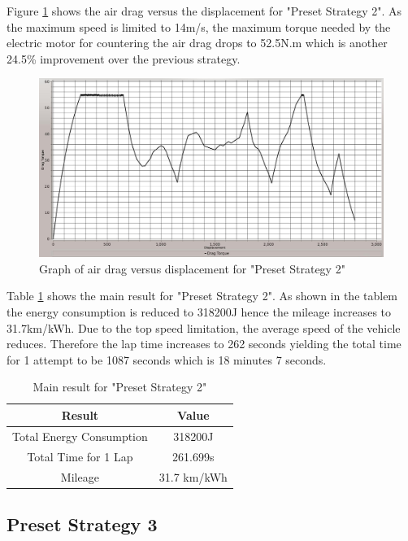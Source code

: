 Figure \ref{im:2_3} shows the air drag versus the displacement for "Preset Strategy 2". As the maximum speed is limited to 14m/s, the maximum torque needed by the electric motor for countering the air drag drops to 52.5N.m which is another 24.5\% improvement over the previous strategy.

\begin{figure}[htb]
	\centering
	\includegraphics[width=6in]{images/2_3.jpg}
	\caption{Graph of air drag versus displacement for "Preset Strategy 2"}
	\label{im:2_3}
\end{figure}

Table \ref{tb:preset2Result} shows the main result for "Preset Strategy 2". As shown in the tablem the energy consumption is reduced to 318200J hence the mileage increases to 31.7km/kWh. Due to the top speed limitation, the average speed of the vehicle reduces. Therefore the lap time increases to 262 seconds yielding the total time for 1 attempt to be 1087 seconds which is 18 minutes 7 seconds. 

\begin{table}[htbp]
\begin{center}
\begin{tabular}{|c|c|}
\hline
\textbf{Result} & \textbf{Value} \\ \hline
Total Energy Consumption & 318200J \\ \hline
Total Time for 1 Lap & 261.699s \\ \hline
Mileage & 31.7 km/kWh \\ \hline
\end{tabular}
\end{center}
\caption{Main result for "Preset Strategy 2" }
\label{tb:preset2Result}
\end{table} \clearpage

\subsection{Preset Strategy 3}

